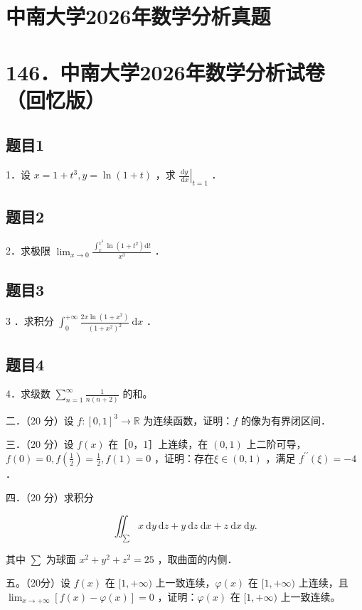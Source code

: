 \documentclass{article}
\begin{document}
\section*{中南大学2026年数学分析真题}
\section*{146．中南大学2026年数学分析试卷（回忆版）}

\subsection{题目1}
1．设 \(x=1+t^{3}, y=\ln (1+t)\) ，求 \(\left.\frac{\mathrm{d} y}{\mathrm{~d} x}\right|_{t=1}\) ．

\subsection{题目2}
2．求极限 \(\lim _{x \rightarrow 0} \frac{\int_{x}^{x^{3}} \ln \left(1+t^{2}\right) \mathrm{d} t}{x^{3}}\) ．

\subsection{题目3}
3 ．求积分 \(\int_{0}^{+\infty} \frac{2 x \ln \left(1+x^{2}\right)}{\left(1+x^{2}\right)^{2}} \mathrm{~d} x\) ．

\subsection{题目4}
4．求级数 \(\sum_{n=1}^{\infty} \frac{1}{n(n+2)}\) 的和。

二．（20 分）设 \(f:[0,1]^{3} \rightarrow \mathbb{R}\) 为连续函数，证明：\(f\) 的像为有界闭区间．

三．（20 分）设 \(f(x)\) 在［0，1］上连续，在 \((0,1)\) 上二阶可导，\(f(0)=0, f\left(\frac{1}{2}\right)=\frac{1}{2}, f(1)=0\) ，证明：存在\(\xi \in(0,1)\) ，满足 \(f^{\prime \prime}(\xi)=-4\) ．

四．（20 分）求积分

\[
\iint_{\sum} x \mathrm{~d} y \mathrm{~d} z+y \mathrm{~d} z \mathrm{~d} x+z \mathrm{~d} x \mathrm{~d} y .
\]

其中 \(\sum\) 为球面 \(x^{2}+y^{2}+z^{2}=25\) ，取曲面的内侧．

五。（20分）设 \(f(x)\) 在 \([1,+\infty)\) 上一致连续，\(\varphi(x)\) 在 \([1,+\infty)\) 上连续，且 \(\lim _{x \rightarrow+\infty}[f(x)-\varphi(x)]=0\) ，证明：\(\varphi(x)\) 在 \([1,+\infty)\) 上一致连续。
\end{document}

